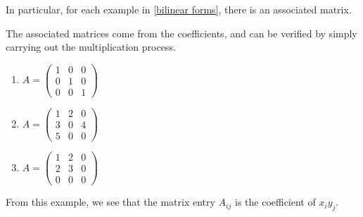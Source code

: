 In particular, for each example in \ref{bilinear forms}, there is an associated matrix. 
\begin{example}
The associated matrices come from the coefficients, and can be verified by simply carrying out the multiplication process. 
\begin{enumerate}
    \item 
$A = \begin{pmatrix} 1 & 0 & 0 \\
0 & 1 & 0 \\
0 & 0 & 1\end{pmatrix}$
\item $A = \begin{pmatrix} 1 & 2 & 0 \\
3 & 0 & 4 \\
5 & 0 & 0\end{pmatrix}$

\item $A = \begin{pmatrix} 1 & 2 & 0 \\
2 & 3 & 0 \\
0 & 0 & 0\end{pmatrix}$
\end{enumerate}

\end{example}

From this example, we see that the matrix entry $A_{ij}$ is the coefficient of $x_iy_j.$

